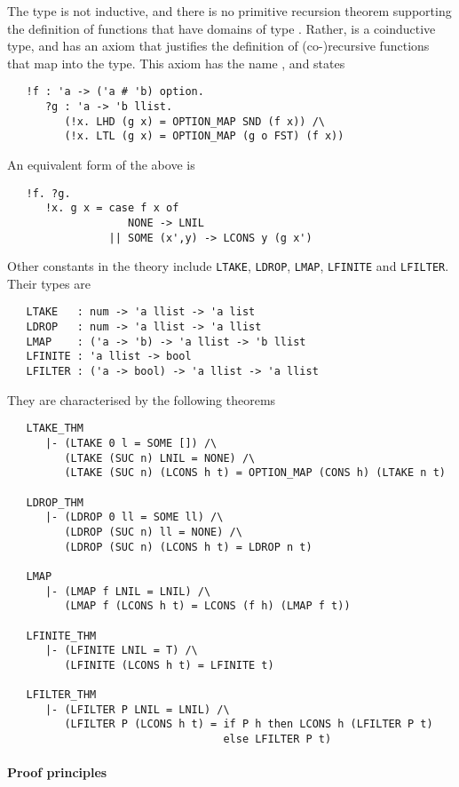 The type  is not inductive, and there is no primitive
recursion theorem supporting the definition of functions that have
domains of type .  Rather,  is a coinductive type,
and has an axiom that justifies the definition of (co-)recursive
functions that map into the  type.  This axiom has the name
, and states
{\small
\begin{verbatim}
   !f : 'a -> ('a # 'b) option.
      ?g : 'a -> 'b llist.
         (!x. LHD (g x) = OPTION_MAP SND (f x)) /\
         (!x. LTL (g x) = OPTION_MAP (g o FST) (f x))
\end{verbatim}
}
\noindent An equivalent form of the above is
{\small
\begin{verbatim}
   !f. ?g.
      !x. g x = case f x of
                   NONE -> LNIL
                || SOME (x',y) -> LCONS y (g x')
\end{verbatim}
}

Other constants in the theory  include \texttt{LTAKE},
\texttt{LDROP}, \texttt{LMAP}, \texttt{LFINITE} and
\texttt{LFILTER}. Their types are
{\small
\begin{verbatim}
   LTAKE   : num -> 'a llist -> 'a list
   LDROP   : num -> 'a llist -> 'a llist
   LMAP    : ('a -> 'b) -> 'a llist -> 'b llist
   LFINITE : 'a llist -> bool
   LFILTER : ('a -> bool) -> 'a llist -> 'a llist
\end{verbatim}
}
\noindent They are characterised by the following theorems
{\small
\begin{verbatim}
   LTAKE_THM
      |- (LTAKE 0 l = SOME []) /\
         (LTAKE (SUC n) LNIL = NONE) /\
         (LTAKE (SUC n) (LCONS h t) = OPTION_MAP (CONS h) (LTAKE n t)

   LDROP_THM
      |- (LDROP 0 ll = SOME ll) /\
         (LDROP (SUC n) ll = NONE) /\
         (LDROP (SUC n) (LCONS h t) = LDROP n t)

   LMAP
      |- (LMAP f LNIL = LNIL) /\
         (LMAP f (LCONS h t) = LCONS (f h) (LMAP f t))

   LFINITE_THM
      |- (LFINITE LNIL = T) /\
         (LFINITE (LCONS h t) = LFINITE t)

   LFILTER_THM
      |- (LFILTER P LNIL = LNIL) /\
         (LFILTER P (LCONS h t) = if P h then LCONS h (LFILTER P t)
                                  else LFILTER P t)
\end{verbatim}
}

\paragraph{Proof principles}

